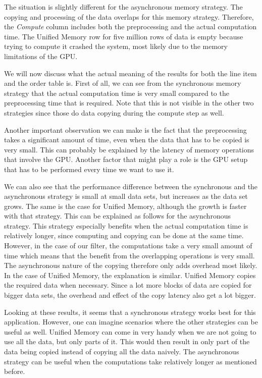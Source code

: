 \documentclass[a4paper,titlepage]{article}
\begin{document}
The situation is slightly different for the asynchronous memory strategy. The copying and processing of the data overlaps for this memory strategy. Therefore, the \emph{Compute} column includes both the preprocessing and the actual computation time. The Unified Memory row for five million rows of data is empty because trying to compute it crashed the system, most likely due to the memory limitations of the GPU.

We will now discuss what the actual meaning of the results for both the line item and the order table is. First of all, we can see from the synchronous memory strategy that the actual computation time is very small compared to the preprocessing time that is required. Note that this is not visible in the other two strategies since those do data copying during the compute step as well.

Another important observation we can make is the fact that the preprocessing takes a significant amount of time, even when the data that has to be copied is very small. This can probably be explained by the latency of memory operations that involve the GPU. Another factor that might play a role is the GPU setup that has to be performed every time we want to use it.

We can also see that the performance difference between the synchronous and the asynchronous strategy is small at small data sets, but increases as the data set grows. The same is the case for Unified Memory, although the growth is faster with that strategy. This can be explained as follows for the asynchronous strategy. This strategy especially benefits when the actual computation time is relatively longer, since computing and copying can be done at the same time. However, in the case of our filter, the computations take a very small amount of time which means that the benefit from the overlapping operations is very small. The asynchronous nature of the copying therefore only adds overhead most likely. In the case of Unified Memory, the explanation is similar. Unified Memory copies the required data when necessary. Since a lot more blocks of data are copied for bigger data sets, the overhead and effect of the copy latency also get a lot bigger.

Looking at these results, it seems that a synchronous strategy works best for this application. However, one can imagine scenarios where the other strategies can be useful as well. Unified Memory can come in very handy when we are not going to use all the data, but only parts of it. This would then result in only part of the data being copied instead of copying all the data naively. The asynchronous strategy can be useful when the computations take relatively longer as mentioned before.
\end{document}
